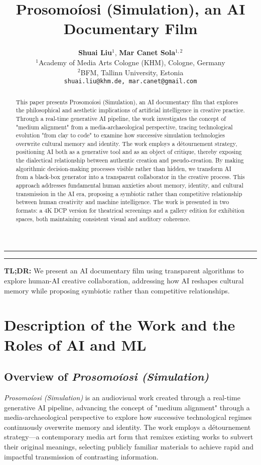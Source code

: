 \documentclass{article}
\title{Prosomoíosi (Simulation), an AI Documentary Film}
\author{
\textbf{Shuai Liu}$^1$, \textbf{Mar Canet Sola}$^{1,2}$\\
$^1$Academy of Media Arts Cologne (KHM), Cologne, Germany\\
$^2$BFM, Tallinn University, Estonia\\
\texttt{shuai.liu@khm.de, mar.canet@gmail.com}
}
\makeatletter
\renewcommand{\maketitle}{%
  \begin{center}
    \rule{\textwidth}{4pt}
    \vspace{1em}
    
    {\fontsize{17}{20}\selectfont\bfseries \@title \par}
    
    \vspace{1em}
    \rule{\textwidth}{1pt}
    
    \vspace{2em}
    
    \@author
    
    \vspace{1em}
  \end{center}
}
\makeatother
\begin{document}
\maketitle

\begin{abstract}
This paper presents Prosomoíosi (Simulation), an AI documentary film that explores the philosophical and aesthetic implications of artificial intelligence in creative practice. Through a real-time generative AI pipeline, the work investigates the concept of "medium alignment" from a media-archaeological perspective, tracing technological evolution "from clay to code" to examine how successive simulation technologies overwrite cultural memory and identity. The work employs a détournement strategy, positioning AI both as a generative tool and as an object of critique, thereby exposing the dialectical relationship between authentic creation and pseudo-creation. By making algorithmic decision-making processes visible rather than hidden, we transform AI from a black-box generator into a transparent collaborator in the creative process. This approach addresses fundamental human anxieties about memory, identity, and cultural transmission in the AI era, proposing a symbiotic rather than competitive relationship between human creativity and machine intelligence. The work is presented in two formats: a 4K DCP version for theatrical screenings and a gallery edition for exhibition spaces, both maintaining consistent visual and auditory coherence.
\end{abstract}

\textbf{TL;DR:} We present an AI documentary film using transparent algorithms to explore human-AI creative collaboration, addressing how AI reshapes cultural memory while proposing symbiotic rather than competitive relationships.

\section{Description of the Work and the Roles of AI and ML}

\subsection{Overview of \textit{Prosomoíosi (Simulation)}}

\textit{Prosomoíosi (Simulation)} is an audiovisual work created through a real-time generative AI pipeline, advancing the concept of "medium alignment" through a media-archaeological perspective to explore how successive technological regimes continuously overwrite memory and identity. The work employs a détournement strategy—a contemporary media art form that remixes existing works to subvert their original meanings, selecting publicly familiar materials to achieve rapid and impactful transmission of contrasting information.
\end{document}
